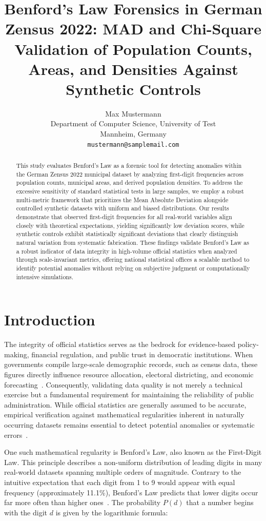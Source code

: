 \documentclass[11pt,a4paper]{article}
\title{\bfseries Benford's Law Forensics in German Zensus 2022: MAD and Chi-Square Validation of Population Counts, Areas, and Densities Against Synthetic Controls}
\author{%
Max Mustermann\\
{\small Department of Computer Science, University of Test}\\
{\small Mannheim, Germany}\\
{\small \texttt{mustermann@samplemail.com}}
}
\date{}
\begin{document}
\maketitle
\thispagestyle{empty}

\begin{abstract}
\noindent
This study evaluates Benford's Law as a forensic tool for detecting anomalies within the German Zensus 2022 municipal dataset by analyzing first-digit frequencies across population counts, municipal areas, and derived population densities. To address the excessive sensitivity of standard statistical tests in large samples, we employ a robust multi-metric framework that prioritizes the Mean Absolute Deviation alongside controlled synthetic datasets with uniform and biased distributions. Our results demonstrate that observed first-digit frequencies for all real-world variables align closely with theoretical expectations, yielding significantly low deviation scores, while synthetic controls exhibit statistically significant deviations that clearly distinguish natural variation from systematic fabrication. These findings validate Benford's Law as a robust indicator of data integrity in high-volume official statistics when analyzed through scale-invariant metrics, offering national statistical offices a scalable method to identify potential anomalies without relying on subjective judgment or computationally intensive simulations.
\end{abstract}

\section{Introduction}
The integrity of official statistics serves as the bedrock for evidence-based policy-making, financial regulation, and public trust in democratic institutions. When governments compile large-scale demographic records, such as census data, these figures directly influence resource allocation, electoral districting, and economic forecasting~\cite{Shalini2023DataQA}. Consequently, validating data quality is not merely a technical exercise but a fundamental requirement for maintaining the reliability of public administration. While official statistics are generally assumed to be accurate, empirical verification against mathematical regularities inherent in naturally occurring datasets remains essential to detect potential anomalies or systematic errors~\cite{Silva2024ANA}.

One such mathematical regularity is Benford's Law, also known as the First-Digit Law. This principle describes a non-uniform distribution of leading digits in many real-world datasets spanning multiple orders of magnitude. Contrary to the intuitive expectation that each digit from 1 to 9 would appear with equal frequency (approximately 11.1\%), Benford's Law predicts that lower digits occur far more often than higher ones~\cite{Hill1998TheFD}. The probability $P(d)$ that a number begins with the digit $d$ is given by the logarithmic formula:
\end{document}
